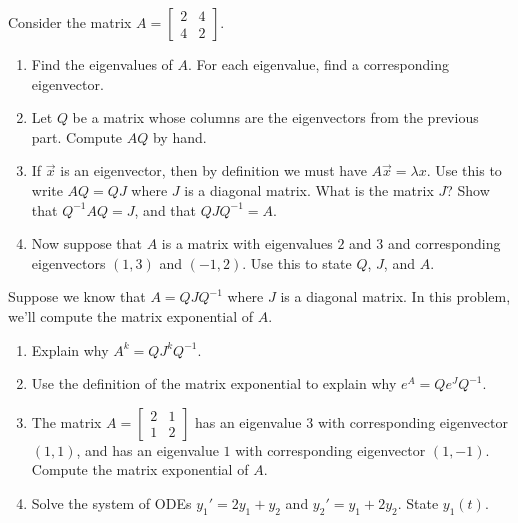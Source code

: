 \begin{problem}
Consider the matrix 
$A=
\begin{bmatrix}
 2 & 4 \\
 4 & 2 
\end{bmatrix}.
$
\begin{enumerate}
 \item Find the eigenvalues of $A$.  For each eigenvalue, find a corresponding eigenvector.
 \item Let $Q$ be a matrix whose columns are the eigenvectors from the previous part. Compute $A Q$ by hand. 
 \item {}%
If $\vec x$ is an eigenvector, then by definition we must have $A\vec x = \lambda x$.  
 Use this to write $AQ=QJ$ where $J$ is a diagonal matrix. What is the matrix $J$? Show that $Q^{-1}AQ =J$, and that $QJQ^{-1}=A$.
 \item {}
Now suppose that $A$ is a matrix with eigenvalues $2$ and $3$ and corresponding eigenvectors $(1,3)$ and $(-1,2)$. Use this to state $Q$, $J$, and $A$.
\end{enumerate}
\end{problem}

\begin{problem}
 Suppose we know that $A = QJQ^{-1}$ where $J$ is a diagonal matrix.  In this problem,  we'll compute the matrix exponential of $A$.
\begin{enumerate}
 \item Explain why $A^k = QJ^kQ^{-1}$.
 \item Use the definition of the matrix exponential to explain why $e^{A} = Qe^{J} Q^{-1}$.
 \item The matrix $A = \begin{bmatrix}2&1\\1&2\end{bmatrix}$ has an eigenvalue $3$ with corresponding eigenvector $(1,1)$, and has an eigenvalue $1$ with corresponding eigenvector $(1,-1)$.  Compute the matrix exponential of $A$. 
 \item Solve the system of ODEs $y_1' = 2y_1+y_2$ and $y_2' = y_1+2y_2$. State $y_1(t)$. 
\end{enumerate}
\end{problem}

